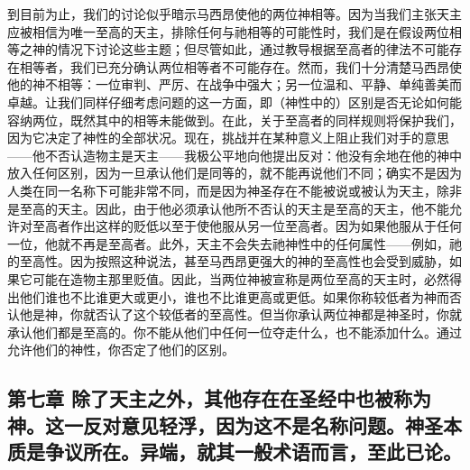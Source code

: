 到目前为止，我们的讨论似乎暗示马西昂使他的两位神相等。因为当我们主张天主应被相信为唯一至高的天主，排除任何与祂相等的可能性时，我们是在假设两位相等之神的情况下讨论这些主题；但尽管如此，通过教导根据至高者的律法不可能存在相等者，我们已充分确认两位相等者不可能存在。然而，我们十分清楚马西昂使他的神不相等：一位审判、严厉、在战争中强大；另一位温和、平静、单纯善美而卓越。让我们同样仔细考虑问题的这一方面，即（神性中的）区别是否无论如何能容纳两位，既然其中的相等未能做到。在此，关于至高者的同样规则将保护我们，因为它决定了神性的全部状况。现在，挑战并在某种意义上阻止我们对手的意思——他不否认造物主是天主——我极公平地向他提出反对：他没有余地在他的神中放入任何区别，因为一旦承认他们是同等的，就不能再说他们不同；确实不是因为人类在同一名称下可能非常不同，而是因为神圣存在不能被说或被认为天主，除非是至高的天主。因此，由于他必须承认他所不否认的天主是至高的天主，他不能允许对至高者作出这样的贬低以至于使他服从另一位至高者。因为如果他服从于任何一位，他就不再是至高者。此外，天主不会失去祂神性中的任何属性——例如，祂的至高性。因为按照这种说法，甚至马西昂更强大的神的至高性也会受到威胁，如果它可能在造物主那里贬值。因此，当两位神被宣称是两位至高的天主时，必然得出他们谁也不比谁更大或更小，谁也不比谁更高或更低。如果你称较低者为神而否认他是神，你就否认了这个较低者的至高性。但当你承认两位神都是神圣时，你就承认他们都是至高的。你不能从他们中任何一位夺走什么，也不能添加什么。通过允许他们的神性，你否定了他们的区别。\par


\subsection{第七章 除了天主之外，其他存在在圣经中也被称为神。这一反对意见轻浮，因为这不是名称问题。神圣本质是争议所在。异端，就其一般术语而言，至此已论。}


